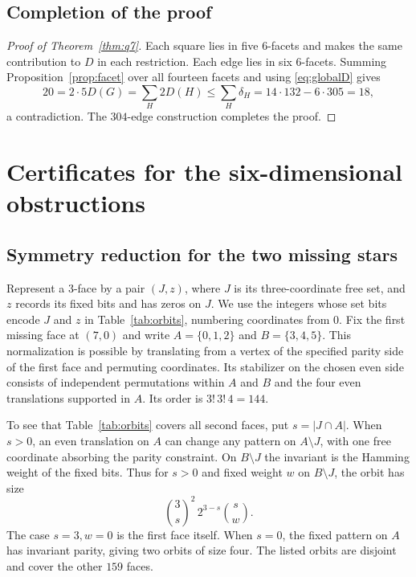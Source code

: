 \documentclass[11pt,reqno]{amsart}
\numberwithin{equation}{section}
\begin{document}
\subsection{Completion of the proof}

\begin{proof}[Proof of Theorem~\ref{thm:q7}]
Each square lies in five \(6\)-facets and makes the same contribution
to \(D\) in each restriction. Each edge lies in six \(6\)-facets.
Summing Proposition~\ref{prop:facet} over all fourteen facets and using
\eqref{eq:globalD} gives
\[
  20=2\cdot5D(G)=\sum_H 2D(H)
    \le \sum_H\delta_H
    =14\cdot132-6\cdot305=18 ,
\]
a contradiction. The \(304\)-edge construction
\cite{dptv,minamoto} completes the proof.
\end{proof}

\appendix
\section{Certificates for the six-dimensional obstructions}
\label{app:certificates}

\subsection{Symmetry reduction for the two missing stars}
\label{app:orbits}

Represent a \(3\)-face by a pair \((J,z)\), where \(J\) is its
three-coordinate free set, and \(z\) records its fixed bits and has
zeros on \(J\). We use the integers whose set bits encode \(J\) and
\(z\) in Table~\ref{tab:orbits}, numbering coordinates from \(0\).
Fix the first missing face at \((7,0)\) and write \(A=\{0,1,2\}\)
and \(B=\{3,4,5\}\). This normalization is possible by translating
from a vertex of the specified parity side of the first face and
permuting coordinates. Its stabilizer on the chosen even side consists
of independent permutations within \(A\) and \(B\) and the four
even translations supported in \(A\). Its order is \(3!\,3!\,4=144\).

To see that Table~\ref{tab:orbits} covers all second faces, put
\(s=|J\cap A|\). When \(s>0\), an even translation on \(A\) can
change any pattern on \(A\setminus J\), with one free coordinate
absorbing the parity constraint. On \(B\setminus J\) the invariant
is the Hamming weight of the fixed bits. Thus for \(s>0\) and fixed
weight \(w\) on \(B\setminus J\), the orbit has size
\[
  \binom 3s^{\!2}\,2^{3-s}\binom{s}{w}.
\]
The case \(s=3,w=0\) is the first face itself. When \(s=0\),
the fixed pattern on \(A\) has invariant parity, giving two orbits
of size four. The listed orbits are disjoint and cover the other
\(159\) faces.
\end{document}
